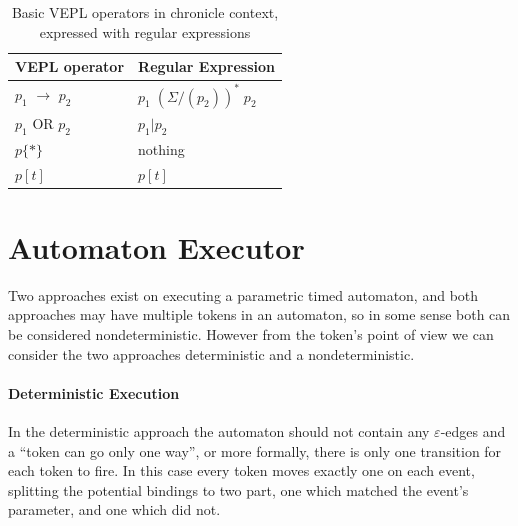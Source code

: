 \begin{table}
	\caption{Basic VEPL operators in chronicle context, expressed with regular expressions}		
	\label{tab:cep:vepl_regex_chronicle}
	\centering
	\begin{tabular}{@{}ll@{}}
		\toprule
		VEPL operator             & Regular Expression               \\ \midrule
		$p_1$ $\rightarrow$ $p_2$ & $p_1 \; (\Sigma/(p_2))^* \; p_2$ \\
		$p_1$ OR $p_2$            & $p_1|p_2$                        \\
		$p\{\ast\}$               & nothing                          \\
		$p[t]$                    & $p[t]$                           \\ \bottomrule
	\end{tabular}
\end{table}

\section{Automaton Executor}
	Two approaches exist on executing a parametric timed automaton, and both approaches may have multiple tokens in an automaton, so in some sense both can be considered nondeterministic.
	However from the token's point of view we can consider the two approaches deterministic and a nondeterministic.
	
	
	\paragraph{Deterministic Execution}
	In the deterministic approach the automaton should not contain any $\varepsilon$-edges and a ``token can go only one way'', or more formally, there is only one transition for each token to fire. 
	In this case every token moves exactly one on each event, splitting the potential bindings to two part, one which matched the event's parameter, and one which did not.
	
